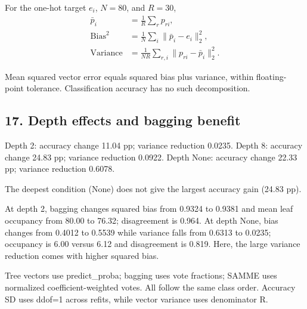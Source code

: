 \documentclass[10pt,twocolumn,letterpaper]{article}
\begin{document}
For the one-hot target $e_i$, $N=80$, and $R=30$,
\begin{align*}
\bar p_i &= \frac{1}{R}\sum_r p_{ri},\\
\mathrm{Bias}^2 &= \frac1N\sum_i\|\bar p_i-e_i\|_2^2,\\
\mathrm{Variance} &= \frac1{NR}\sum_{r,i}\|p_{ri}-\bar p_i\|_2^2.
\end{align*}

Mean squared vector error equals squared bias plus variance, within floating-point tolerance. Classification accuracy has no such decomposition.

\newpage
\subsection*{17. Depth effects and bagging benefit}
Depth 2: accuracy change 11.04 pp; variance reduction 0.0235. Depth 8: accuracy change 24.83 pp; variance reduction 0.0922. Depth None: accuracy change 22.33 pp; variance reduction 0.6078.

The deepest condition (None) does not give the largest accuracy gain (24.83 pp).

At depth 2, bagging changes squared bias from 0.9324 to 0.9381 and mean leaf occupancy from 80.00 to 76.32; disagreement is 0.964. At depth None, bias changes from 0.4012 to 0.5539 while variance falls from 0.6313 to 0.0235; occupancy is 6.00 versus 6.12 and disagreement is 0.819. Here, the large variance reduction comes with higher squared bias.

Tree vectors use predict\_proba; bagging uses vote fractions; SAMME uses normalized coefficient-weighted votes. All follow the same class order. Accuracy SD uses ddof=1 across refits, while vector variance uses denominator R.

\clearpage
{}
\end{document}
